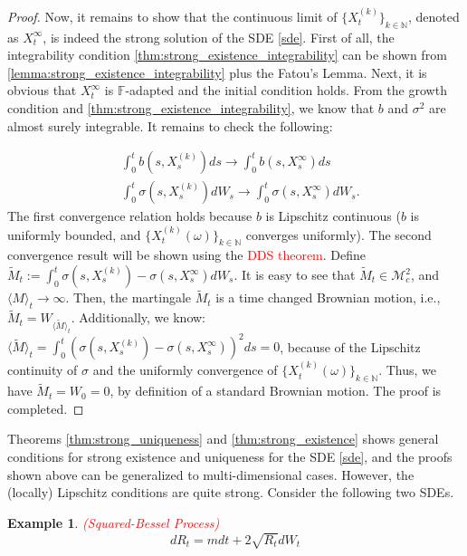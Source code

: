 \documentclass{article}
\newtheorem{ex}{Example}
\begin{document}
\begin{proof}
Now, it remains to show that the continuous limit of $\{X_t^{(k)}\}_{k\in\mathbb{N}}$, denoted as $X^\infty_t$, is indeed the strong solution of the SDE \eqref{sde}. First of all, the integrability condition \eqref{thm:strong_existence_integrability} can be shown from \eqref{lemma:strong_existence_integrability} plus the Fatou's Lemma. Next, it is obvious that $X^\infty_t$ is $\mathbb{F}$-adapted and the initial condition holds. From the growth condition and \eqref{thm:strong_existence_integrability}, we know that $b$ and $\sigma^2$ are almost surely integrable. It remains to check the following:

\begin{equation*}
\begin{aligned}
&\int^t_0b(s,X_s^{(k)})ds\rightarrow\int^t_0b(s,X_s^\infty)ds\\
&\int^t_0\sigma(s,X_s^{(k)})dW_s\rightarrow\int^t_0\sigma(s,X_s^\infty)dW_s.
\end{aligned}
\end{equation*}
The first convergence relation holds because $b$ is Lipschitz continuous ($b$ is uniformly bounded, and $\{X_t^{(k)}(\omega)\}_{k\in\mathbb{N}}$ converges uniformly). The second convergence result will be shown using the \textcolor{red}{DDS theorem}. Define $\tilde{M}_t:=\int^t_0\sigma(s,X_s^{(k)})-\sigma(s,X_s^\infty)dW_s$. It is easy to see that $\tilde{M}_t\in\mathcal{M}_c^2$, and $\langle M\rangle_t\rightarrow\infty$. Then, the martingale $\tilde{M}_t$ is a time changed Brownian motion, i.e., $\tilde{M}_t=W_{\langle \tilde{M}\rangle_t}$. Additionally, we know: $\langle \tilde{M}\rangle_t=\int^t_0(\sigma(s,X_s^{(k)})-\sigma(s,X_s^\infty))^2ds=0$, because of the Lipschitz continuity of $\sigma$ and the uniformly convergence of $\{X_t^{(k)}(\omega)\}_{k\in\mathbb{N}}$. Thus, we have $\tilde{M}_t=W_0=0$, by definition of a standard Brownian motion. The proof is completed.

\end{proof}

Theorems \ref{thm:strong_uniqueness} and \ref{thm:strong_existence} shows general conditions for strong existence and uniqueness for the SDE \eqref{sde}, and the proofs shown above can be generalized to multi-dimensional cases. However, the (locally) Lipschitz conditions are quite strong. Consider the following two SDEs. 

\begin{ex} \textcolor{red}{(Squared-Bessel Process)}
\begin{equation*}
dR_t=mdt+2\sqrt{R_t}dW_t
\end{equation*}
\end{ex}
\end{document}
